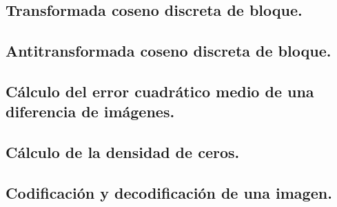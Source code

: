 \documentclass[%
final,
%
reprint,
%
notitlepage,
narroweqnarray,
inline,
twoside,
invited
]{ieee}
\begin{document}
\subsection{Transformada coseno discreta de bloque. }


\subsection{Antitransformada coseno discreta de bloque. }


\subsection{Cálculo del error cuadrático medio de una diferencia de imágenes. }


\subsection{Cálculo de la densidad de ceros. }


\subsection{Codificación y decodificación de una imagen.}

\end{document}
